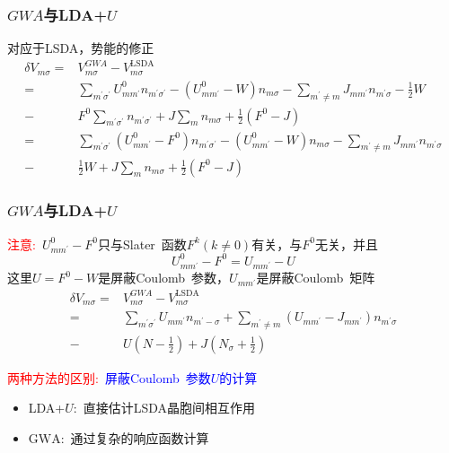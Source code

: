 \documentclass[cjk,slidestop,compress,mathserif,blue]{beamer}
\begin{document}
\frame
{
	\frametitle{$GWA$与\textrm{LDA+}$U$}
	对应于\textrm{LSDA}，势能的修正
	\begin{displaymath}
		\begin{aligned}
			\delta V_{m\sigma}=&V_{m\sigma}^{GWA}-V_{m\sigma}^{\mathrm{LSDA}}\\
			=&\sum_{m^{\prime}\sigma^{\prime}}U_{mm^{\prime}}^0n_{m^{\prime}\sigma^{\prime}}-(U_{mm^{\prime}}^0-W)n_{m\sigma}-\sum_{m^{\prime}\neq m}J_{mm^{\prime}}n_{m^{\prime}\sigma}-\frac12W\\
			-&F^0\sum_{m^{\prime}\sigma^{\prime}}n_{m^{\prime}\sigma^{\prime}}+J\sum_mn_{m\sigma}+\frac12(F^0-J)\\
			=&\sum_{m^{\prime}\sigma^{\prime}}(U_{mm^{\prime}}^0-F^0)n_{m^{\prime}\sigma^{\prime}}-(U_{mm^{\prime}}^0-W)n_{m\sigma}-\sum_{m^{\prime}\neq m}J_{mm^{\prime}}n_{m^{\prime}\sigma}\\
			-&\frac12W+J\sum_mn_{m\sigma}+\frac12(F^0-J)
		\end{aligned}
	\end{displaymath}
}

\frame
{
	\frametitle{$GWA$与\textrm{LDA+}$U$}
	\textcolor{red}{注意:~}$U_{mm^{\prime}}^0-F^0$只与\textrm{Slater~}函数$F^k(k\neq0)$有关，与$F^0$无关，并且
	\begin{displaymath}
		U_{mm^{\prime}}^0-F^0=U_{mm^{\prime}}-U
	\end{displaymath}
	这里$U=F^0-W$是屏蔽\textrm{Coulomb~}参数，$U_{mm^{\prime}}$是屏蔽\textrm{Coulomb~}矩阵
	\begin{displaymath}
		\begin{aligned}
			\delta V_{m\sigma}=&V_{m\sigma}^{GWA}-V_{m\sigma}^{\mathrm{LSDA}}\\
			=&\sum_{m^{\prime}\sigma^{\prime}}U_{mm^{\prime}}n_{m^{\prime}-\sigma}+\sum_{m^{\prime}\neq m}(U_{mm^{\prime}}-J_{mm^{\prime}})n_{m^{\prime}\sigma}\\
			-&U(N-\frac12)+J(N_{\sigma}+\frac12)
		\end{aligned}
	\end{displaymath}

	\textcolor{red}{两种方法的区别:~}\textcolor{blue}{屏蔽\textrm{Coulomb~}参数$U$的计算}
	\begin{itemize}
		\item \textrm{LDA+}$U$:~直接估计\textrm{LSDA}晶胞间相互作用
		\item $\mathrm{GWA}$:~通过复杂的响应函数计算
	\end{itemize}
}
\end{document}
